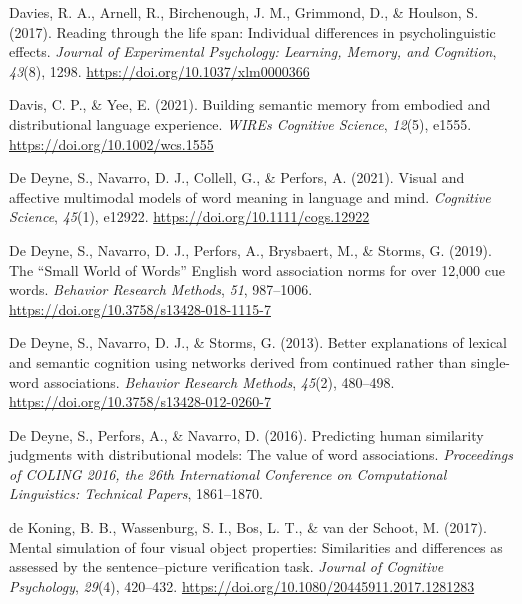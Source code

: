 \documentclass[
  12pt,
  man,floatsintext]{apa7}
\newlength{\cslhangindent}
\newlength{\cslentryspacingunit} %
\newenvironment{CSLReferences}[2] %
 {%
  \setlength{\parindent}{0pt}
  \ifodd #1
  \let\oldpar\par
  \def\par{\hangindent=\cslhangindent\oldpar}
  \fi
  \setlength{\parskip}{#2\cslentryspacingunit}
 }%
 {}
\begin{document}
\begin{CSLReferences}{1}{0}
\leavevmode{}%
Davies, R. A., Arnell, R., Birchenough, J. M., Grimmond, D., \& Houlson, S. (2017). Reading through the life span: {Individual} differences in psycholinguistic effects. \emph{Journal of Experimental Psychology: Learning, Memory, and Cognition}, \emph{43}(8), 1298. \url{https://doi.org/10.1037/xlm0000366}

\leavevmode{}%
Davis, C. P., \& Yee, E. (2021). Building semantic memory from embodied and distributional language experience. \emph{WIREs Cognitive Science}, \emph{12}(5), e1555. \url{https://doi.org/10.1002/wcs.1555}

\leavevmode{}%
De Deyne, S., Navarro, D. J., Collell, G., \& Perfors, A. (2021). Visual and affective multimodal models of word meaning in language and mind. \emph{Cognitive Science}, \emph{45}(1), e12922. \url{https://doi.org/10.1111/cogs.12922}

\leavevmode{}%
De Deyne, S., Navarro, D. J., Perfors, A., Brysbaert, M., \& Storms, G. (2019). The {``{Small World} of {Words}''} {English} word association norms for over 12,000 cue words. \emph{Behavior Research Methods}, \emph{51}, 987--1006. \url{https://doi.org/10.3758/s13428-018-1115-7}

\leavevmode{}%
De Deyne, S., Navarro, D. J., \& Storms, G. (2013). Better explanations of lexical and semantic cognition using networks derived from continued rather than single-word associations. \emph{Behavior Research Methods}, \emph{45}(2), 480--498. \url{https://doi.org/10.3758/s13428-012-0260-7}

\leavevmode{}%
De Deyne, S., Perfors, A., \& Navarro, D. (2016). Predicting human similarity judgments with distributional models: {The} value of word associations. \emph{Proceedings of {COLING} 2016, the 26th International Conference on Computational Linguistics: {Technical} Papers}, 1861--1870.

\leavevmode{}%
de Koning, B. B., Wassenburg, S. I., Bos, L. T., \& van der Schoot, M. (2017). Mental simulation of four visual object properties: Similarities and differences as assessed by the sentence--picture verification task. \emph{Journal of Cognitive Psychology}, \emph{29}(4), 420--432. \url{https://doi.org/10.1080/20445911.2017.1281283}


\end{CSLReferences}
\end{document}

